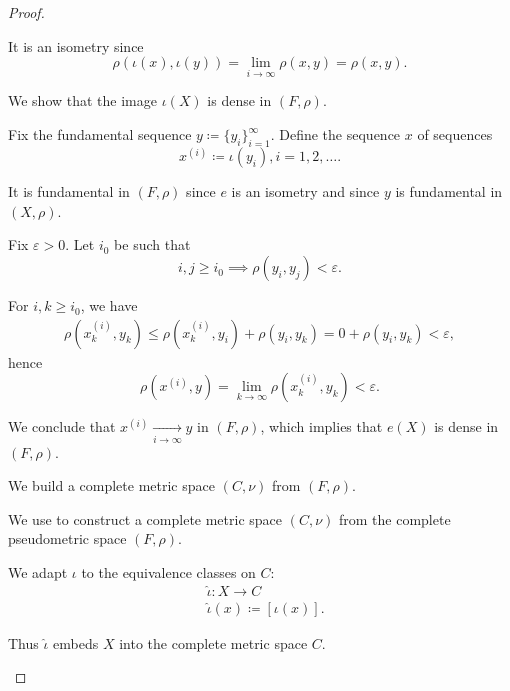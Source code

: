 \begin{proof}
\begin{defenum}
    It is an isometry since
    \begin{equation*}
      \rho(\iota(x),\iota(y)) = \lim_{i \to \infty} \rho(x, y) = \rho(x, y).
    \end{equation*}

     We show that the image \( \iota(X) \) is dense in \( (F, \rho) \).

    Fix the fundamental sequence \( y \coloneqq \{ y_i \}_{i=1}^\infty \). Define the sequence \( x \) of sequences
    \begin{equation*}
      x^{(i)} \coloneqq \iota(y_i), i = 1, 2, \ldots.
    \end{equation*}

    It is fundamental in \( (F, \rho) \) since \( e \) is an isometry and since \( y \) is fundamental in \( (X, \rho) \).

    Fix \( \varepsilon > 0 \). Let \( i_0 \) be such that
    \begin{equation*}
      i, j \geq i_0 \implies \rho(y_i, y_j) < \varepsilon.
    \end{equation*}

    For \( i, k \geq i_0 \), we have
    \begin{align*}
      \rho(x_k^{(i)}, y_k)
      \leq
      \rho(x_k^{(i)}, y_i) + \rho(y_i, y_k)
      =
      0 + \rho(y_i, y_k)
      <
      \varepsilon,
    \end{align*}
    hence
    \begin{equation*}
      \rho(x^{(i)}, y) = \lim_{k \to \infty} \rho(x_k^{(i)}, y_k) < \varepsilon.
    \end{equation*}

    We conclude that \( x^{(i)} \xrightarrow[i \to \infty]{} y \) in \( (F, \rho) \), which implies that \( e(X) \) is dense in \( (F, \rho) \).

     We build a complete metric space \( (C, \nu) \) from \( (F, \rho) \).

    We use  to construct a complete metric space \( (C, \nu) \) from the complete pseudometric space \( (F, \rho) \).

    We adapt \( \iota \) to the equivalence classes on \( C \):
    \begin{align*}
      &\hat\iota: X \to C \\
      &\hat\iota(x) \coloneqq [\iota(x)].
    \end{align*}

    Thus \( \hat\iota \) embeds \( X \) into the complete metric space \( C \).
  \end{defenum}
\end{proof}

